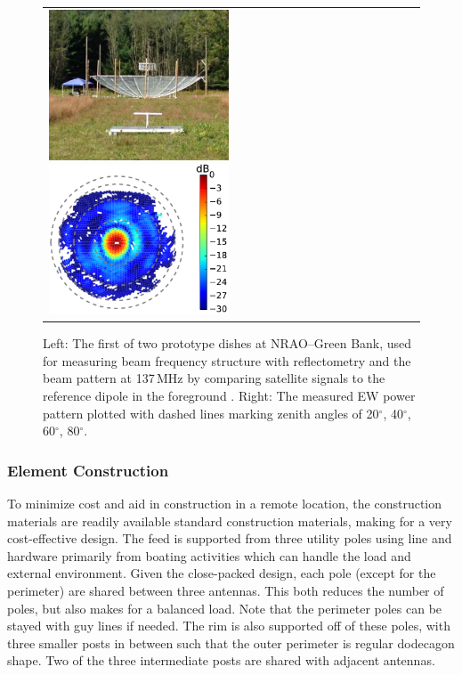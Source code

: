 \documentclass[preprint,11pt]{aastex}
\begin{document}
\begin{figure}[h!]
	\begin{tabular}{ll}
	\begin{minipage}{4.2in}
\includegraphics[width=2.1in]{plots/ref_dipole_and_hera_dish.jpg}
\includegraphics[width=2.1in]{plots/orbcomm_dish_beam_map_530cm_feed.pdf}
	\end{minipage} & 
	\begin{minipage}{2.05in}
	\caption{Left: The first of two prototype dishes at NRAO--Green Bank, used for measuring beam frequency structure with reflectometry and the beam pattern at 137\,MHz by comparing satellite signals to the reference dipole in the foreground \citep{neben_et_al2016}. Right: The measured EW power pattern plotted with dashed lines marking zenith angles of 20$^\circ$, 40$^\circ$, 60$^\circ$, 80$^\circ$.} 
	\label{fig:orbcommexptandbeammap}
	\end{minipage}
	\end{tabular}
	\vspace{-15pt}
\end{figure}

\subsubsection{Element Construction}
To minimize cost and aid in construction in a remote location, the construction materials are readily available standard construction materials, making for a very cost-effective design.  The feed is supported from three utility poles using line and hardware primarily from boating activities which can handle the load and external environment.  Given the close-packed design, each pole (except for the perimeter) are shared between three antennas.  This both reduces the number of poles, but also makes for a balanced load.  Note that the perimeter poles can be stayed with guy lines if needed.   The rim is also supported off of these poles, with three smaller posts in between such that the outer perimeter is regular dodecagon shape.  Two of the three intermediate posts are shared with adjacent antennas.
\end{document}
